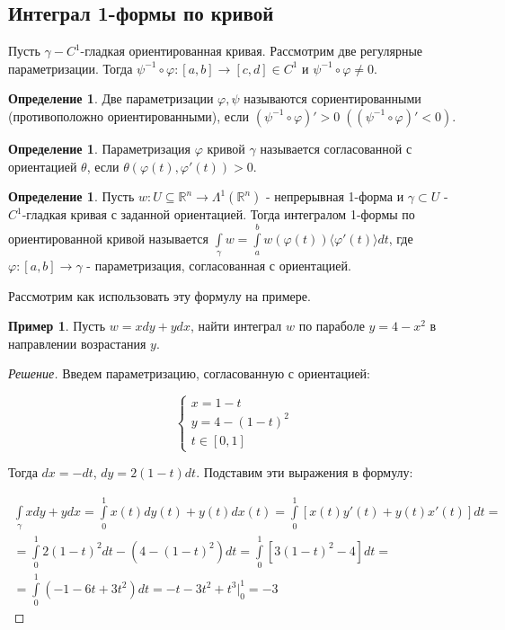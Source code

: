 \documentclass[a5paper]{article}
\newcounter{through}
\theoremstyle{plain}
\theoremstyle{definition}
\newtheorem{definition}[through]{Определение}
\newtheorem{example}[through]{Пример}
\numberwithin{through}{section}
\numberwithin{equation}{section}
\begin{document}
\subsection{Интеграл 1-формы по кривой} %

Пусть $\gamma - C^1$-гладкая ориентированная кривая. Рассмотрим две регулярные параметризации. Тогда $\psi^{-1} \circ \varphi : [a, b] \to [c, d] \in C^1$ и $\psi^{-1} \circ \varphi \not= 0$.

\begin{definition}
	Две параметризации $\varphi, \psi$ называются сориентированными (противоположно ориентированными), если $(\psi^{-1} \circ \varphi)' > 0 \; ((\psi^{-1} \circ \varphi)' < 0)$.
\end{definition}

\begin{definition}
	Параметризация $\varphi$ кривой $\gamma$ называется согласованной с ориентацией $\theta$, если $\theta(\varphi(t), \varphi'(t))>0$.
\end{definition}

\begin{definition}
	Пусть $w : U \subseteq \mathbb{R}^n \to \Lambda^1(\mathbb{R}^n)$ - непрерывная 1-форма и $\gamma \subset U$ - $C^1$-гладкая кривая с заданной ориентацией. Тогда интегралом 1-формы по ориентированной кривой называется $\int\limits_{\gamma} w = \int\limits_{a}^{b} w(\varphi(t)) \langle \varphi'(t) \rangle dt$, где $\varphi : [a, b] \to \gamma$ - параметризация, согласованная с ориентацией.
\end{definition}

Рассмотрим как использовать эту формулу на примере.

\begin{example}
	Пусть $w = xdy + ydx$, найти интеграл $w$ по параболе $y = 4 - x^2$ в направлении возрастания $y$.
\end{example}

\begin{proof}[Решение]
	Введем параметризацию, согласованную с ориентацией:
	
	\begin{equation*}
		\begin{cases}
			x = 1 - t\\
			y = 4 - (1 - t)^2 \\
			t \in [0, 1]
		\end{cases}
	\end{equation*}
	
	Тогда $dx=-dt$, $dy=2(1-t)dt$. Подставим эти выражения в формулу:
	
	\begin{multline*}
		\int\limits_{\gamma} xdy+ydx = \int\limits_{0}^{1}x(t)dy(t)+y(t)dx(t) = \int\limits_{0}^{1} [x(t)y'(t) + y(t)x'(t)]dt  = \\ = \int\limits_{0}^{1} 2(1-t)^2dt - (4 - (1-t)^2)dt = \int\limits_{0}^{1} [3(1-t)^2 - 4]dt = \\ =  \int\limits_{0}^{1} (-1 - 6t + 3t^2)dt = -t-3t^2+t^3 \bigg|_0^1 = -3
	\end{multline*}
\end{proof}
\end{document}

